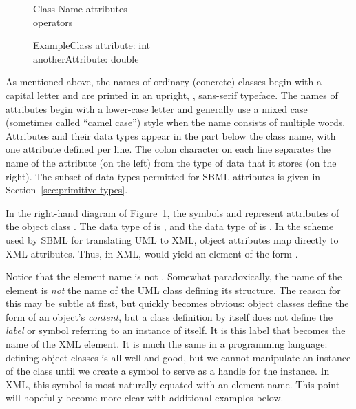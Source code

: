 \begin{blockChanged}
\begin{figure}[htb]
  \centering
  \small
  \begin{blockChanged}
    \begin{classbox}{Class Name}
      attributes\\
      \hline
      operators\\
    \end{classbox}
    \quad  \quad
    \begin{classbox}{ExampleClass}
      attribute: int \\
      anotherAttribute: double\\
    \end{classbox}
  \end{blockChanged}
  \caption{}
  \label{fig:simple-class-eg}
\end{figure}

As mentioned above, the names of ordinary (concrete) classes begin
with a capital letter and are printed in an upright,
, sans-serif typeface.  The names of attributes
begin with a lower-case letter and generally use a mixed case
(sometimes called ``camel case'') style when the name consists of
multiple words.  Attributes and their data types appear in the
part below the class name, with one attribute defined per line.
The colon character on each line separates the name of the
attribute (on the left) from the type of data that it stores (on
the right).  The subset of data types permitted for SBML
attributes is given in Section~\ref{sec:primitive-types}.

In the right-hand diagram of Figure~\ref{fig:simple-class-eg}, the
symbols  and  represent
attributes of the object class .  The data
type of  is , and the data type of
 is .  In the scheme used
by SBML for translating UML to XML, object attributes map directly
to XML attributes.  Thus, in XML,  would yield
an element of the form .

Notice that the element name is not .
Somewhat paradoxically, the name of the element is \emph{not} the
name of the UML class defining its structure.  The reason for this
may be subtle at first, but quickly becomes obvious: object
classes define the form of an object's \emph{content}, but a class
definition by itself does not define the \emph{label} or symbol
referring to an instance of itself.  It is this label that becomes
the name of the XML element.  It is much the same in a programming
language: defining object classes is all well and good, but we
cannot manipulate an instance of the class until we create a
symbol to serve as a handle for the instance.  In XML, this symbol
is most naturally equated with an element name.  This point will
hopefully become more clear with additional examples below.



\end{blockChanged}
